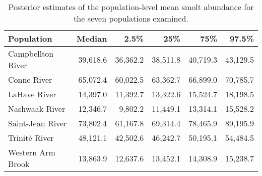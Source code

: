\begin{table}[ht]
\centering
\caption{Posterior estimates of the population-level 
                    mean smolt abundance for the seven populations examined.} 
\begin{tabular}{lrrrrr}
  \hline
Population & Median & 2.5\% & 25\% & 75\% & 97.5\% \\ 
  \hline
Campbellton River & 39,618.6 & 36,362.2 & 38,511.8 & 40,719.3 & 43,129.5 \\ 
  Conne River & 65,072.4 & 60,022.5 & 63,362.7 & 66,899.0 & 70,785.7 \\ 
  LaHave River & 14,397.0 & 11,392.7 & 13,322.6 & 15,524.7 & 18,198.5 \\ 
  Nashwaak River & 12,346.7 & 9,802.2 & 11,449.1 & 13,314.1 & 15,528.2 \\ 
  Saint-Jean River & 73,802.4 & 61,167.8 & 69,314.4 & 78,465.9 & 89,195.9 \\ 
  Trinité River & 48,121.1 & 42,502.6 & 46,242.7 & 50,195.1 & 54,484.5 \\ 
  Western Arm Brook & 13,863.9 & 12,637.6 & 13,452.1 & 14,308.9 & 15,238.7 \\ 
   \hline
\end{tabular}
\end{table}
